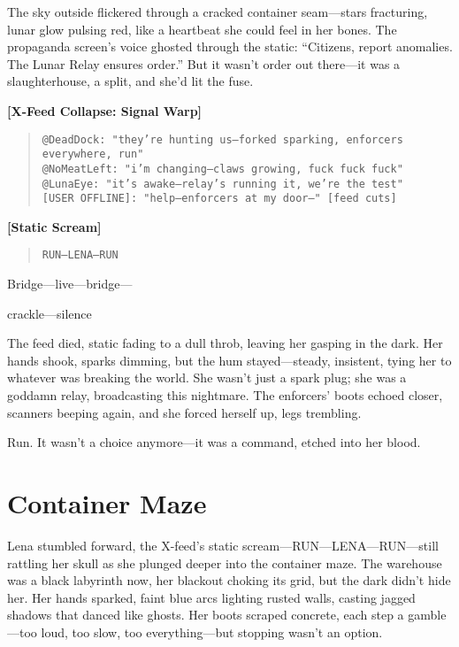 \documentclass[12pt]{book}
\begin{document}
The sky outside flickered through a cracked container seam---stars fracturing, lunar glow pulsing red, like a heartbeat she could feel in her bones. The propaganda screen’s voice ghosted through the static: ``Citizens, report anomalies. The Lunar Relay ensures order.'' But it wasn’t order out there---it was a slaughterhouse, a split, and she’d lit the fuse.

\bigskip
\noindent\textbf{[X-Feed Collapse: Signal Warp]}
\begin{quote}
\texttt{@DeadDock: "they’re hunting us---forked sparking, enforcers everywhere, run"}\\[1ex]
\texttt{@NoMeatLeft: "i’m changing---claws growing, fuck fuck fuck"}\\[1ex]
\texttt{@LunaEye: "it’s awake---relay’s running it, we’re the test"}\\[1ex]
\texttt{[USER OFFLINE]: "help---enforcers at my door---" [feed cuts]}
\end{quote}

\bigskip
\noindent\textbf{[Static Scream]}
\begin{quote}
\texttt{RUN---LENA---RUN}
\end{quote}

Bridge---live---bridge---

crackle---silence

The feed died, static fading to a dull throb, leaving her gasping in the dark. Her hands shook, sparks dimming, but the hum stayed---steady, insistent, tying her to whatever was breaking the world. She wasn’t just a spark plug; she was a goddamn relay, broadcasting this nightmare. The enforcers’ boots echoed closer, scanners beeping again, and she forced herself up, legs trembling.

Run. It wasn’t a choice anymore---it was a command, etched into her blood.

\section{Container Maze}

Lena stumbled forward, the X-feed’s static scream---RUN---LENA---RUN---still rattling her skull as she plunged deeper into the container maze. The warehouse was a black labyrinth now, her blackout choking its grid, but the dark didn’t hide her. Her hands sparked, faint blue arcs lighting rusted walls, casting jagged shadows that danced like ghosts. Her boots scraped concrete, each step a gamble---too loud, too slow, too everything---but stopping wasn’t an option.
\end{document}
